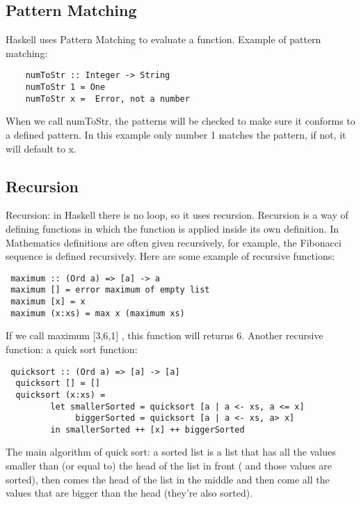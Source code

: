\documentclass{article}
\begin{document}
\subsection{Pattern Matching}
Haskell uses Pattern Matching to evaluate a function.
\newline Example of pattern matching:
\begin{lstlisting}
	numToStr :: Integer -> String
	numToStr 1 = One
	numToStr x =  Error, not a number
\end{lstlisting}
 When we call numToStr, the patterns will be checked to make sure it conforms to a defined pattern. In this example only number 1 matches the pattern, if not, it will default to x.    

\subsection{Recursion}
Recursion: in Haskell there is no loop, so it uses recursion.
\newline Recursion is a way of defining functions in which the function is applied inside its own definition. In Mathematics definitions are often given recursively, for example, the Fibonacci sequence is defined recursively.
\newline Here are some example of recursive functions:
\begin{lstlisting}
 maximum :: (Ord a) => [a] -> a
 maximum [] = error maximum of empty list
 maximum [x] = x
 maximum (x:xs) = max x (maximum xs)
\end{lstlisting}
If we call maximum [3,6,1] , this function will returns 6.
\newline Another recursive function: a quick sort function: 
\begin{lstlisting}
 quicksort :: (Ord a) => [a] -> [a]
  quicksort [] = []
  quicksort (x:xs) = 
         let smallerSorted = quicksort [a | a <- xs, a <= x]
              biggerSorted = quicksort [a | a <- xs, a> x]
         in smallerSorted ++ [x] ++ biggerSorted
\end{lstlisting}
The main algorithm of quick sort: a sorted list is a list that has  all the values smaller than (or equal to) the head of the list in front ( and those values are sorted), then comes the head of the list in the middle and then come all the values that are bigger than the head (they’re also sorted).
\end{document}
